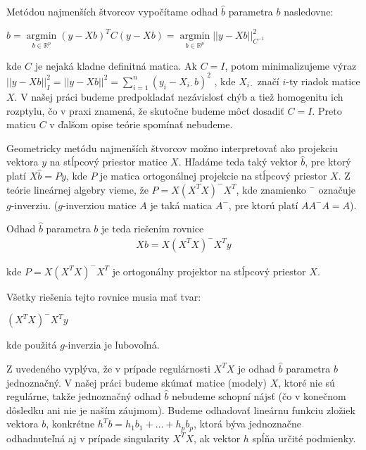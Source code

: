 Metódou najmenších štvorcov vypočítame odhad $\hat{b}$ parametra $b$ nasledovne:

\begin{center}
$
\hat{b} = \underset{b \in \mathbb{R}^{p}}{\operatorname{arg min}} (y - Xb)^T C (y - Xb) =
\underset{b \in \mathbb{R}^{p}}{\operatorname{arg min}} ||y - Xb||_{C^{-1}}^2
$
\end{center}

kde $C$ je nejaká kladne definitná matica. 
Ak $C = I$, potom minimalizujeme výraz
$||y - Xb||_I^2 = ||y - Xb||^2 = \sum_{i=1}^n (y_i - X_{i \cdot } b)^2$
, kde $X_{i \cdot }$ značí $i$-ty riadok matice $X$.
V našej práci budeme predpokladať nezávislosť chýb a tiež homogenitu ich rozptylu, čo v praxi znamená,
že skutočne budeme môcť dosadiť $C = I$.
Preto maticu $C$ v ďalšom opise teórie spomínať nebudeme.

Geometricky metódu najmenších štvorcov možno interpretovať ako projekciu vektora $y$ 
na stĺpcový priestor matice $X$. Hľadáme teda taký vektor $\hat{b}$, 
pre ktorý platí $X \hat{b} = Py$, kde $P$ je matica ortogonálnej projekcie na stĺpcový priestor $X$. 
Z teórie lineárnej algebry vieme, že $P = X (X^T X)^- X^T$, kde znamienko $^-$ označuje $g$-inverziu.
($g$-inverziou matice $A$ je taká matica $A^-$, pre ktorú platí $A A^- A = A$).

Odhad $\hat{b}$ parametra $b$ je teda riešením rovnice
\begin{align}
\label{least squares solution}
X b =  X (X^T X)^- X^T y
\end{align}

kde $P = X (X^T X)^- X^T$ je ortogonálny projektor na stĺpcový priestor $X$.

Všetky riešenia tejto rovnice musia mať tvar:

\begin{center}
$
(X^T X)^- X^T y
$
\end{center}

kde použitá $g$-inverzia je ľubovoľná.

Z uvedeného vyplýva, že v prípade regulárnosti $X^T X$ je odhad $\hat{b}$ parametra $b$ jednoznačný. 
V našej práci budeme skúmať matice (modely) $X$, ktoré nie sú regulárne, 
takže jednoznačný odhad $\hat{b}$ nebudeme schopní nájsť (čo v konečnom dôsledku ani nie je naším záujmom).
Budeme odhadovať lineárnu funkciu zložiek vektora $b$, konkrétne $h^T b = h_1 b_1 + \ldots + h_p b_p$,
ktorá býva jednoznačne odhadnuteľná aj v prípade singularity $X^T X$, ak vektor $h$ spĺňa určité podmienky. 

